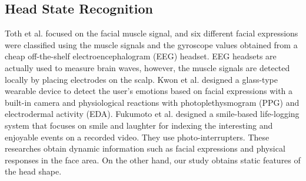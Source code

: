 \documentclass[sigchi,authordraft]{acmart}
\begin{document}
\subsection{Head State Recognition}
Toth et al.\cite{facial_expression_headset} focused on the facial muscle signal, and six different facial expressions were classified using the muscle signals and the gyroscope values obtained from a cheap off-the-shelf electroencephalogram (EEG) headset. EEG headsets are actually used to measure brain waves, however, the muscle signals are detected locally by placing electrodes on the scalp.
Kwon et al.\cite{facial_expression_glasses} designed a glass-type wearable device to detect the user's emotions based on facial expressions with a built-in camera and physiological reactions with photoplethysmogram (PPG) and electrodermal activity (EDA).
Fukumoto et al.\cite{fukumoto} designed a smile-based life-logging system that focuses on smile and laughter for indexing the interesting and enjoyable events on a recorded video. They use photo-interrupters. %
These researches obtain dynamic information such as facial expressions and physical responses in the face area. On the other hand, our study obtains static features of the head shape.\par
\end{document}
